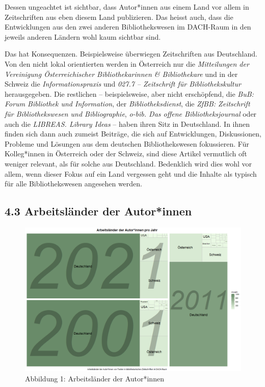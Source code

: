 \documentclass[a4paper,
fontsize=11pt,
oneside,
numbers=noperiodatend,
parskip=half-,
bibliography=totoc,
final
]{scrartcl}
\begin{document}
Dessen ungeachtet ist sichtbar, dass Autor*innen aus einem Land vor
allem in Zeitschriften aus eben diesem Land publizieren. Das heisst
auch, dass die Entwicklungen aus den zwei anderen Bibliothekswesen im
DACH-Raum in den jeweils anderen Ländern wohl kaum sichtbar sind.

Das hat Konsequenzen. Beispielsweise überwiegen Zeitschriften aus
Deutschland. Von den nicht lokal orientierten werden in Österreich nur
die \emph{Mitteilungen der Vereinigung Österreichischer
Bibliothekarinnen \& Bibliothekare} und in der Schweiz die
\emph{Informationspraxis} und \emph{027.7 -- Zeitschrift für
Bibliothekskultur} herausgegeben. Die restlichen -- beispielsweise, aber
nicht erschöpfend, die \emph{BuB: Forum Bibliothek und Information}, der
\emph{Bibliotheksdienst}, die \emph{ZfBB: Zeitschrift für
Bibliothekswesen und Bibliographie}, \emph{o-bib. Das offene
Bibliotheksjournal} oder auch die \emph{LIBREAS. Library Ideas} -- haben
ihren Sitz in Deutschland. In ihnen finden sich dann auch zumeist
Beiträge, die sich auf Entwicklungen, Diskussionen, Probleme und
Lösungen aus dem deutschen Bibliothekswesen fokussieren. Für
Kolleg*innen in Österreich oder der Schweiz, sind diese Artikel
vermutlich oft weniger relevant, als für solche aus Deutschland.
Bedenklich wird dies wohl vor allem, wenn dieser Fokus auf ein Land
vergessen geht und die Inhalte als typisch für alle Bibliothekswesen
angesehen werden.

\hypertarget{arbeitsluxe4nder-der-autorinnen-1}{%
\subsection{4.3 Arbeitsländer der
Autor*innen}\label{arbeitsluxe4nder-der-autorinnen-1}}

\begin{figure}[p!]
\centering
\includegraphics[width=1.3\textwidth, angle=90]{img/abb1.PNG}
\caption{Abbildung 1: Arbeitsländer der Autor*innen}
\end{figure}
\end{document}
